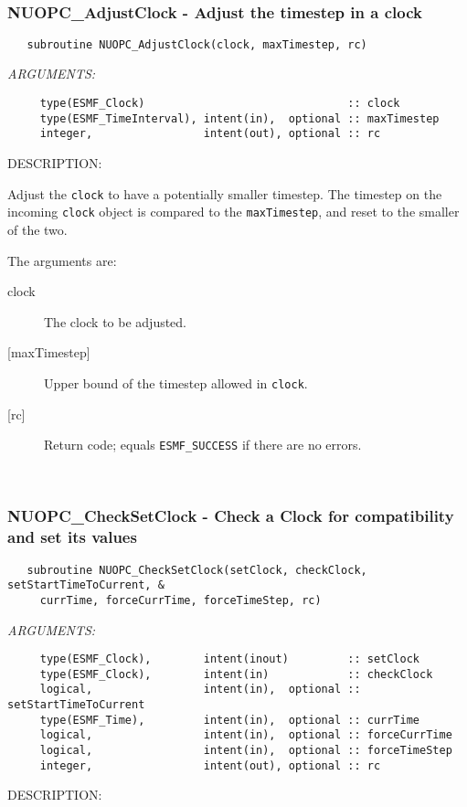 \mbox{}\hrulefill\ 
 
\subsubsection [NUOPC\_AdjustClock] {NUOPC\_AdjustClock - Adjust the timestep in a clock}


\begin{verbatim}   subroutine NUOPC_AdjustClock(clock, maxTimestep, rc)\end{verbatim}{\em ARGUMENTS:}
\begin{verbatim}     type(ESMF_Clock)                               :: clock
     type(ESMF_TimeInterval), intent(in),  optional :: maxTimestep
     integer,                 intent(out), optional :: rc\end{verbatim}
{\sf DESCRIPTION:\\ }


     Adjust the {\tt clock} to have a potentially smaller timestep. The timestep
     on the incoming {\tt clock} object is compared to the {\tt maxTimestep}, and
     reset to the smaller of the two.
  
     The arguments are:
     \begin{description}
     \item[clock]
       The clock to be adjusted.
     \item[{[maxTimestep]}]
       Upper bound of the timestep allowed in {\tt clock}. 
     \item[{[rc]}]
       Return code; equals {\tt ESMF\_SUCCESS} if there are no errors.
     \end{description}
   
 
\mbox{}\hrulefill\ 
 
\subsubsection [NUOPC\_CheckSetClock] {NUOPC\_CheckSetClock - Check a Clock for compatibility and set its values}


\begin{verbatim}   subroutine NUOPC_CheckSetClock(setClock, checkClock, setStartTimeToCurrent, &
     currTime, forceCurrTime, forceTimeStep, rc)\end{verbatim}{\em ARGUMENTS:}
\begin{verbatim}     type(ESMF_Clock),        intent(inout)         :: setClock
     type(ESMF_Clock),        intent(in)            :: checkClock
     logical,                 intent(in),  optional :: setStartTimeToCurrent
     type(ESMF_Time),         intent(in),  optional :: currTime
     logical,                 intent(in),  optional :: forceCurrTime
     logical,                 intent(in),  optional :: forceTimeStep
     integer,                 intent(out), optional :: rc\end{verbatim}
{\sf DESCRIPTION:\\ }


